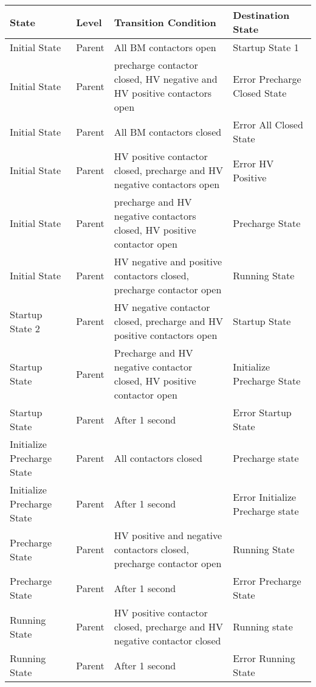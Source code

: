 \documentclass[12pt, titlepage]{article}
\newcommand{\tableVspace}{5mm}
\begin{document}
\vspace{\tableVspace}\noindent
\begin{tabular}{| p{} | p{} | p{} | p{} | }
\hline
\rowcolor[gray]{0.9}
\hline
State & Level &Transition Condition & Destination State \\
\hline
Initial State & Parent & All BM contactors open & Startup State 1\\
\hline
Initial State & Parent & precharge contactor closed, HV negative and HV positive contactors open & Error Precharge Closed State\\
\hline
Initial State & Parent & All BM contactors closed & Error All Closed State\\
\hline
Initial State & Parent & HV positive contactor closed, precharge and HV negative contactors open & Error HV Positive\\
\hline
Initial State & Parent & precharge and HV negative contactors closed, HV positive contactor open & Precharge State\\
\hline
Initial State & Parent & HV negative and positive contactors closed, precharge contactor open & Running State\\
\hline
Startup State 2 & Parent & HV negative contactor closed, precharge and HV positive contactors open & Startup State\\
\hline
Startup State & Parent & Precharge and HV negative contactor closed, HV positive contactor open & Initialize Precharge State\\
\hline
Startup State & Parent & After 1 second & Error Startup State\\
\hline
Initialize Precharge State & Parent & All contactors closed & Precharge state\\
\hline
Initialize Precharge State & Parent & After 1 second & Error Initialize Precharge state\\
\hline
Precharge State & Parent & HV positive and negative contactors closed, precharge contactor open & Running State\\
\hline
Precharge State & Parent & After 1 second & Error Precharge State\\
\hline
Running State & Parent & HV positive contactor closed, precharge and HV negative contactor closed & Running state\\
\hline
Running State & Parent & After 1 second & Error Running State\\
\hline

\end{tabular}
        
\end{document}
